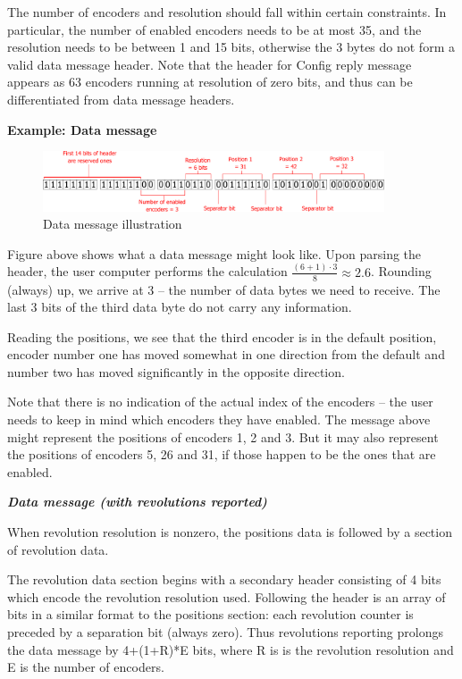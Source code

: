 \documentclass[twoside]{article}
\begin{document}
The number of encoders and resolution should fall within certain constraints. In particular, the number of enabled encoders needs to be at most 35, and the resolution needs to be between 1 and 15 bits, otherwise the 3 bytes do not form a valid data message header. Note that the header for Config reply message appears as 63 encoders running at resolution of zero bits, and thus can be differentiated from data message headers.


\textbf{Example: Data message}
\begin{figure}[h]
	\centering
	\includegraphics[width=0.9\textwidth]{figs/reply2}
	\caption{Data message illustration}

\end{figure}

Figure above shows what a data message might look like. Upon parsing the header, the user computer performs the calculation $\frac{(6+1)\cdot{}3}{8} \approx 2.6$. Rounding (always) up, we arrive at 3 -- the number of data bytes we need to receive. The last 3 bits of the third data byte do not carry any information.

Reading the positions, we see that the third encoder is in the default position, encoder number one has moved somewhat in one direction from the default and number two has moved significantly in the opposite direction.

Note that there is no indication of the actual index of the encoders -- the user needs to keep in mind which encoders they have enabled. The message above might represent the positions of encoders 1, 2 and 3. But it may also represent the positions of encoders 5, 26 and 31, if those happen to be the ones that are enabled.

\noindent{}\emph{\textbf{Data message (with revolutions reported)}}

When revolution resolution is nonzero, the positions data is followed by a section of revolution data. 

The revolution data section begins with a secondary header consisting of 4 bits which encode the revolution resolution used. Following the header is an array of bits in a similar format to the positions section: each revolution counter is preceded by a separation bit (always zero). Thus revolutions reporting prolongs the data message by 4+(1+R)*E bits, where R is is the revolution resolution and E is the number of encoders.
\end{document}
